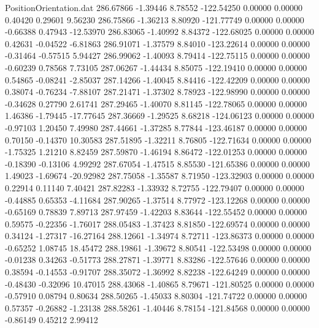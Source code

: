 \begin{filecontents}{PositionOrientation.dat}
 286.67866   -1.39446    8.78552  -122.54250    0.00000    0.00000    0.40420    0.29601    9.56230
 286.75866   -1.36213    8.80920  -121.77749    0.00000    0.00000   -0.66388    0.47943  -12.53970
 286.83065   -1.40992    8.84372  -122.68025    0.00000    0.00000    0.42631   -0.04522   -6.81863
 286.91071   -1.37579    8.84010  -123.22614    0.00000    0.00000   -0.31464   -0.57515    5.94427
 286.99062   -1.40093    8.79414  -122.75115    0.00000    0.00000   -0.60239    0.78568    7.73105
 287.06267   -1.44434    8.85075  -122.19410    0.00000    0.00000    0.54865   -0.08241   -2.85037
 287.14266   -1.40045    8.84416  -122.42209    0.00000    0.00000    0.38074   -0.76234   -7.88107
 287.21471   -1.37302    8.78923  -122.98990    0.00000    0.00000   -0.34628    0.27790    2.61741
 287.29465   -1.40070    8.81145  -122.78065    0.00000    0.00000    1.46386   -1.79445  -17.77645
 287.36669   -1.29525    8.68218  -124.06123    0.00000    0.00000   -0.97103    1.20450    7.49980
 287.44661   -1.37285    8.77844  -123.46187    0.00000    0.00000    0.70150   -0.14370   10.30583
 287.51895   -1.32211    8.76805  -122.71634    0.00000    0.00000   -1.75325    1.21210    8.82459
 287.59870   -1.46194    8.86472  -122.01253    0.00000    0.00000   -0.18390   -0.13106    4.99292
 287.67054   -1.47515    8.85530  -121.65386    0.00000    0.00000    1.49023   -1.69674  -20.92982
 287.75058   -1.35587    8.71950  -123.32903    0.00000    0.00000    0.22914    0.11140    7.40421
 287.82283   -1.33932    8.72755  -122.79407    0.00000    0.00000   -0.44885    0.65353   -4.11684
 287.90265   -1.37514    8.77972  -123.12268    0.00000    0.00000   -0.65169    0.78839    7.89713
 287.97459   -1.42203    8.83644  -122.55452    0.00000    0.00000    0.59575   -0.22356   -1.76017
 288.05483   -1.37423    8.81850  -122.69574    0.00000    0.00000    0.34124   -1.27317  -16.27164
 288.12661   -1.34974    8.72711  -123.86373    0.00000    0.00000   -0.65252    1.08745   18.45472
 288.19861   -1.39672    8.80541  -122.53498    0.00000    0.00000   -0.01238    0.34263   -0.51773
 288.27871   -1.39771    8.83286  -122.57646    0.00000    0.00000    0.38594   -0.14553   -0.91707
 288.35072   -1.36992    8.82238  -122.64249    0.00000    0.00000   -0.48430   -0.32096   10.47015
 288.43068   -1.40865    8.79671  -121.80525    0.00000    0.00000   -0.57910    0.08794    0.80634
 288.50265   -1.45033    8.80304  -121.74722    0.00000    0.00000    0.57357   -0.26882   -1.23138
 288.58261   -1.40446    8.78154  -121.84568    0.00000    0.00000   -0.86149    0.45212    2.99412

\end{filecontents}
